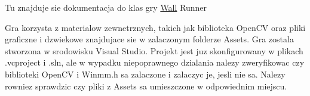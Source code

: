 Tu znajduje sie dokumentacja do klas gry \mbox{\hyperlink{class_wall}{Wall}} Runner

Gra korzysta z materialow zewnetrznych, takich jak biblioteka Open\+CV oraz pliki graficzne i dzwiekowe znajdujace sie w zalaczonym folderze Assets. Gra zostala stworzona w srodowisku Visual Studio. Projekt jest juz skonfigurowany w plikach .vcproject i .sln, ale w wypadku niepoprawnego dzialania nalezy zweryfikowac czy biblioteki Open\+CV i Winmm.\+h sa zalaczone i zalaczyc je, jesli nie sa. Nalezy rowniez sprawdzic czy pliki z Assets sa umieszczone w odpowiednim miejscu. 